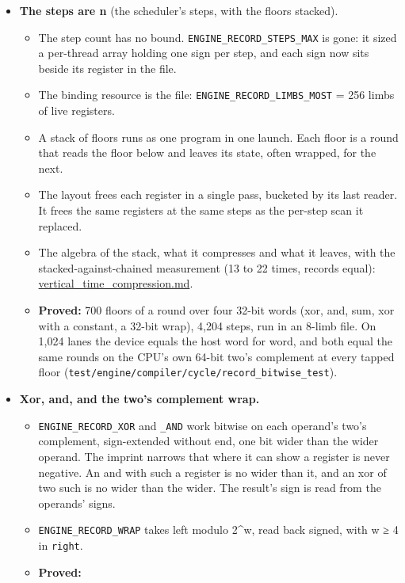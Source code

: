 \begin{itemize}
\item \textbf{The steps are n} (the scheduler's steps, with the floors stacked).

\begin{itemize}
\item The step count has no bound. \texttt{ENGINE\_\allowbreak{}RECORD\_\allowbreak{}STEPS\_\allowbreak{}MAX} is gone: it sized a per-thread array holding one sign per step, and each sign now sits beside its register in the file.
\item The binding resource is the file: \texttt{ENGINE\_\allowbreak{}RECORD\_\allowbreak{}LIMBS\_\allowbreak{}MOST} = 256 limbs of live registers.
\item A stack of floors runs as one program in one launch. Each floor is a round that reads the floor below and leaves its state, often wrapped, for the next.
\item The layout frees each register in a single pass, bucketed by its last reader. It frees the same registers at the same steps as the per-step scan it replaced.
\item The algebra of the stack, what it compresses and what it leaves, with the stacked-against-chained measurement (13 to 22 times, records equal): \hyperref[chap:vertical-time-compression]{vertical\_\allowbreak{}time\_\allowbreak{}compression.md}.
\item \textbf{Proved:} 700 floors of a round over four 32-bit words (xor, and, sum, xor with a constant, a 32-bit wrap), 4,204 steps, run in an 8-limb file. On 1,024 lanes the device equals the host word for word, and both equal the same rounds on the CPU's own 64-bit two's complement at every tapped floor (\texttt{test/\allowbreak{}engine/\allowbreak{}compiler/\allowbreak{}cycle/\allowbreak{}record\_\allowbreak{}bitwise\_\allowbreak{}test}).
\end{itemize}
\item \textbf{Xor, and, and the two's complement wrap.}

\begin{itemize}
\item \texttt{ENGINE\_\allowbreak{}RECORD\_\allowbreak{}XOR} and \texttt{\_\allowbreak{}AND} work bitwise on each operand's two's complement, sign-extended without end, one bit wider than the wider operand. The imprint narrows that where it can show a register is never negative. An and with such a register is no wider than it, and an xor of two such is no wider than the wider. The result's sign is read from the operands' signs.
\item \texttt{ENGINE\_\allowbreak{}RECORD\_\allowbreak{}WRAP} takes left modulo 2\textasciicircum{}w, read back signed, with w ≥ 4 in \texttt{right}.
\item \textbf{Proved:}


\end{itemize}
\end{itemize}

